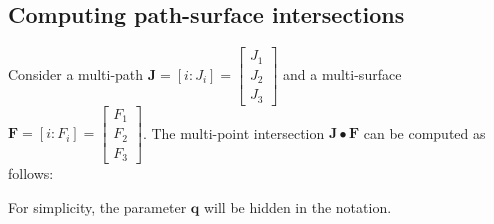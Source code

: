 \documentclass{book}
\begin{document}
\subsection*{Computing path-surface intersections}

Consider a multi-path \(\mathbf{J} = [i : J_i] = \begin{bmatrix} J_1 \\ J_2 \\ J_3 \end{bmatrix}\) and a multi-surface \(\mathbf{F} = [i : F_i] = \begin{bmatrix} F_1 \\ F_2 \\ F_3 \end{bmatrix}\). The multi-point intersection \(\mathbf{J} \bullet \mathbf{F}\) can be computed as follows:

For simplicity, the parameter \(\mathbf{q}\) will be hidden in the notation.

\vspace{1mm}
\end{document}
